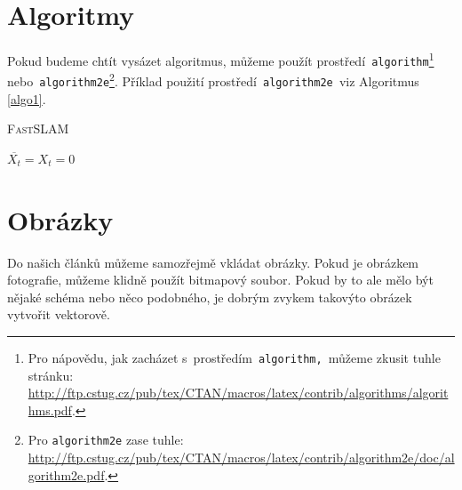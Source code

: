 \documentclass[a4paper, 11pt]{article}
\begin{document}
			\section{Algoritmy}\label{algoritmy}
			Pokud budeme chtít vysázet algoritmus, můžeme použít prostředí\texttt{ algorithm}\footnote{Pro nápovědu, jak zacházet s~prostředím\texttt{ algorithm, }můžeme zkusit tuhle stránku:\\\href{http://ftp.cstug.cz/pub/tex/CTAN/macros/latex/contrib/algorithms/algorithms.pdf}{http://ftp.cstug.cz/pub/tex/CTAN/macros/latex/contrib/algorithms/algorithms.pdf}.} nebo\texttt{ algorithm2e}\footnote{Pro \texttt{algorithm2e} zase tuhle: \href{http://ftp.cstug.cz/pub/tex/CTAN/macros/latex/contrib/algorithm2e/doc/algorithm2e.pdf}{http://ftp.cstug.cz/pub/tex/CTAN/macros/latex/contrib/algorithm2e/doc/algorithm2e.pdf}.}. Příklad použití prostředí\texttt{ algorithm2e }viz Algoritmus \ref*{algo1}.
			\begin{algorithm}\label{algo1}
				\caption{\textsc{FastSLAM}}
				\SetNlSty{}{\fontsize{9}{10}\selectfont}{:}
				\BlankLine
				\SetNlSkip{-0.55cm}
				\Indp \Indp
				$\overline{X_{t}}=X_{t}=0$ \\
			\end{algorithm}
									
			\section{Obrázky}
			Do našich článků můžeme samozřejmě vkládat obrázky. Pokud je obrázkem fotografie, můžeme klidně použít bitmapový soubor. Pokud by to ale mělo být nějaké schéma nebo něco podobného, je dobrým zvykem takovýto obrázek vytvořit vektorově.
									
\end{document}
